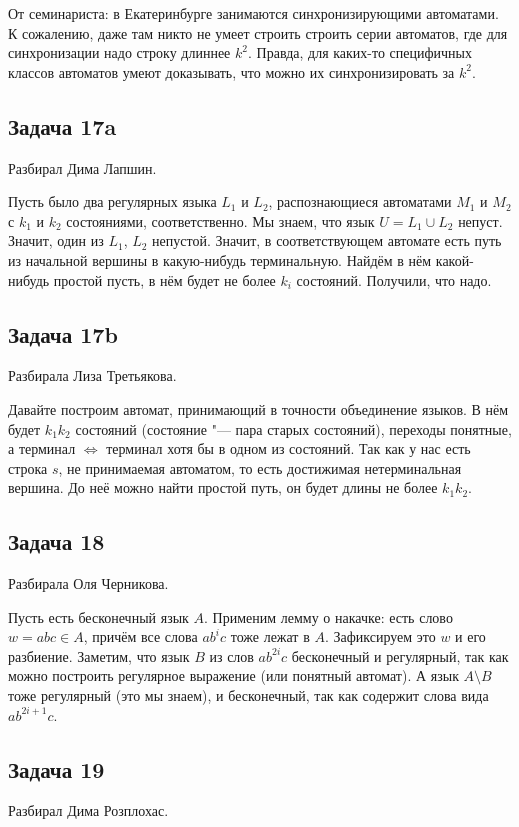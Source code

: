 	\begin{Rem}
		От семинариста: в Екатеринбурге занимаются синхронизирующими автоматами.
		К сожалению, даже там никто не умеет строить строить серии автоматов,
		где для синхронизации надо строку длиннее $k^2$.
		Правда, для каких-то специфичных классов автоматов умеют доказывать, что
		можно их синхронизировать за $k^2$.
	\end{Rem}

\subsection{Задача 17a}
	Разбирал Дима Лапшин.

	Пусть было два регулярных языка $L_1$ и $L_2$, распознающиеся автоматами $M_1$ и $M_2$
	с $k_1$ и $k_2$ состояниями, соответственно.
	Мы знаем, что язык $U=L_1\cup L_2$ непуст.
	Значит, один из $L_1$, $L_2$ непустой.
	Значит, в соответствующем автомате есть путь из начальной вершины в какую-нибудь терминальную.
	Найдём в нём какой-нибудь простой пусть, в нём будет не более $k_i$ состояний.
	Получили, что надо.

\subsection{Задача 17b}
	Разбирала Лиза Третьякова.

	Давайте построим автомат, принимающий в точности объединение языков.
	В нём будет $k_1k_2$ состояний (состояние "--- пара старых состояний),
	переходы понятные, а терминал $\iff$ терминал хотя бы в одном из состояний.
	Так как у нас есть строка $s$, не принимаемая автоматом, то есть достижимая нетерминальная вершина.
	До неё можно найти простой путь, он будет длины не более $k_1k_2$.

\subsection{Задача 18}
	Разбирала Оля Черникова.

	Пусть есть бесконечный язык $A$.
	Применим лемму о накачке: есть слово $w=abc \in A$, причём все слова $ab^ic$ тоже лежат в $A$.
	Зафиксируем это $w$ и его разбиение.
	Заметим, что язык $B$ из слов $ab^{2i}c$ бесконечный и регулярный, так как можно построить регулярное выражение
	(или понятный автомат).
	А язык $A\setminus B$ тоже регулярный (это мы знаем), и бесконечный, так как содержит слова вида $ab^{2i+1}c$.

\subsection{Задача 19}
	Разбирал Дима Розплохас.


